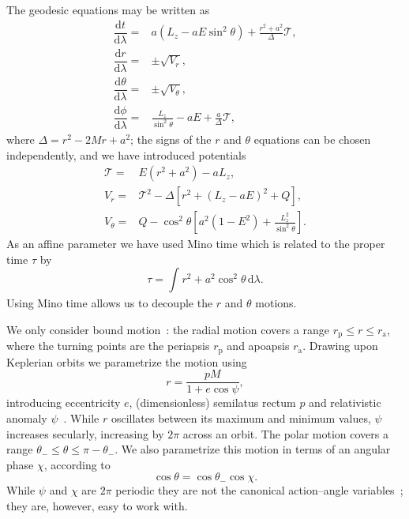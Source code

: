 \documentclass[aps,prd,amsfonts,amssymb,amsmath,nofootinbib,reprint,showpacs,superscriptaddress,twocolumn]{revtex4}
\newcommand{\sub}[1]{\ensuremath{_\text{#1}}}
\newcommand{\dd}{\ensuremath{\mathrm{d}}}
\newcommand{\diff}[2]{\ensuremath{\dfrac{\dd {#1}}{\dd {#2}}}}
\newcommand{\intd}[4]{\ensuremath{\int_{#1}^{#2}{#3}\,\dd{#4}}}
\begin{document}
The geodesic equations may be written as~\cite{Carter1968, Chandrasekhar1992} %
\begin{subequations}
\begin{align}
\diff{t}{\lambda} = {} & a\left(L_z - aE\sin^2 \theta\right) + \frac{r^2 + a^2}{\Delta}\mathcal{T},\\
\diff{r}{\lambda} = {} & \pm \sqrt{V_r},\\
\diff{\theta}{\lambda} = {} & \pm \sqrt{V_\theta},\\
\diff{\phi}{\lambda} = {} & \frac{L_z}{\sin^2 \theta} - aE + \frac{a}{\Delta}\mathcal{T},
\end{align}
\end{subequations}
where $\Delta = r^2 - 2M r + a^2$; the signs of the $r$ and $\theta$ equations can be chosen independently, and we have introduced potentials
\begin{subequations}
\begin{align}
\mathcal{T} = {} & E\left(r^2 +a^2\right) - aL_z,\\
V_r = {} & \mathcal{T}^2 - \Delta\left[r^2 + \left(L_z -aE\right)^2 + Q\right],\\
V_\theta = {} & Q - \cos^2 \theta\left[a^2\left(1 - E^2\right) + {\displaystyle \frac{L_z^2}{\sin^2\theta}}\right].
\end{align}
\end{subequations}
As an affine parameter we have used Mino time which is related to the proper time $\tau$ by~\cite{Mino2003}
\begin{equation}
\tau = \intd{}{}{r^2 + a^2 \cos^2\theta}{\lambda}.
\end{equation}
Using Mino time allows us to decouple the $r$ and $\theta$ motions.

We only consider bound motion~\cite{Wilkins1972}: the radial motion covers a range $r\sub{p} \leq r \leq r\sub{a}$, where the turning points are the periapsis $r\sub{p}$ and apoapsis $r\sub{a}$. Drawing upon Keplerian orbits we parametrize the motion using
\begin{equation}
r = \frac{p M}{1+e\cos\psi},
\end{equation}
introducing eccentricity $e$, (dimensionless) semilatus rectum $p$ and relativistic anomaly $\psi$~\cite{Darwin1961,Drasco2004}. While $r$ oscillates between its maximum and minimum values, $\psi$ increases secularly, increasing by $2\pi$ across an orbit. The polar motion covers a range $\theta_- \leq \theta \leq \pi - \theta_-$. We also parametrize this motion in terms of an angular phase $\chi$, according to~\cite{Hughes2000}
\begin{equation}
\cos\theta = \cos\theta_-\cos\chi.
\end{equation}
While $\psi$ and $\chi$ are $2\pi$ periodic they are not the canonical action--angle variables~\cite{Schmidt2002}; they are, however, easy to work with.
\end{document}
